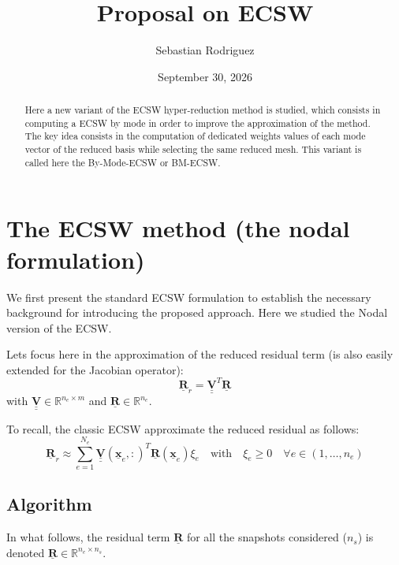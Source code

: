 \documentclass[a4paper,12pt]{article}
\title{Proposal on ECSW}
\author{Sebastian Rodriguez}
\date{September 30, 2026}
\newcommand{\vect}[1]{\underline{\boldsymbol{#1}}}
\newcommand{\matr}[1]{\underline{\underline{\boldsymbol{#1}}}}
\begin{document}
\maketitle

\begin{abstract}
Here a new variant of the ECSW hyper-reduction method is studied, which consists in computing a ECSW by mode in order to improve the approximation of the method. The key idea consists in the computation of dedicated weights values of each mode vector of the reduced basis while selecting the same reduced mesh. This variant is called here the By-Mode-ECSW or BM-ECSW.
\end{abstract}

\section{The ECSW method (the nodal formulation)}
We first present the standard ECSW formulation to establish the necessary background for introducing the proposed approach. Here we studied the Nodal version of the ECSW.

Lets focus here in the approximation of the reduced residual term (is also easily extended for the Jacobian operator):
\begin{equation}
\vect{R}_r=\matr{V}^{T}\vect{R}
\label{eq:reduced-residual}
\end{equation}
with $\matr{V}\in\mathbb{R}^{n_e\times m}$ and $\vect{R}\in\mathbb{R}^{n_e}$.

To recall, the classic ECSW approximate the reduced residual as follows:
\begin{equation}
\vect{R}_r\approx\sum_{e=1}^{N_e}\matr{V}(\vect{x}_e,:)^{T}\vect{R}(\vect{x}_e)\xi_e
\quad\text{with}\quad
\xi_e\geq 0\quad\forall e\in(1,\ldots,n_e)
\label{eq:classic-ecsw}
\end{equation}

\subsection{Algorithm}
In what follows, the residual term $\vect{R}$ for all the snapshots considered ($n_s$) is denoted $\vect{R}\in\mathbb{R}^{n_e\times n_s}$.
\end{document}
